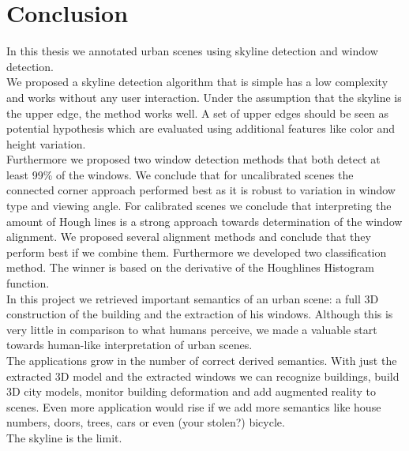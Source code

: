 \section{Conclusion}
In this thesis we annotated urban scenes using skyline detection and window
detection.\\

We proposed a skyline detection algorithm that is simple has a low complexity
and works without any user interaction.  Under the assumption that the skyline
is the upper edge, the method works well.  A set of upper edges should be seen
as potential hypothesis which are evaluated using additional features like color
and height variation.\\

Furthermore we proposed two window detection methods that both detect at least
99\% of the windows.  We conclude that for uncalibrated scenes the connected
corner approach performed best as it is robust to variation in window type and
viewing angle.  For calibrated scenes we conclude that 
interpreting the amount of Hough lines is a strong approach
towards determination of the window alignment. 
We proposed several alignment methods and conclude that they
perform best if we combine them.
Furthermore we developed two classification method. The winner is based on the
derivative of the Houghlines Histogram function.  \\

In this project we retrieved important semantics of an urban scene: a
full 3D construction of the building and the extraction of his windows.
Although this is very little in comparison to what humans perceive, we made a
valuable start towards human-like interpretation of urban scenes.\\

The applications grow in the number of correct derived semantics. With just the
extracted 3D model and the extracted windows we can recognize buildings,
build 3D city models, monitor building deformation and add augmented reality
to scenes.  Even more application would rise if we add more semantics like
house numbers, doors, trees, cars or even (your stolen?) bicycle. \\

The skyline is the limit.

